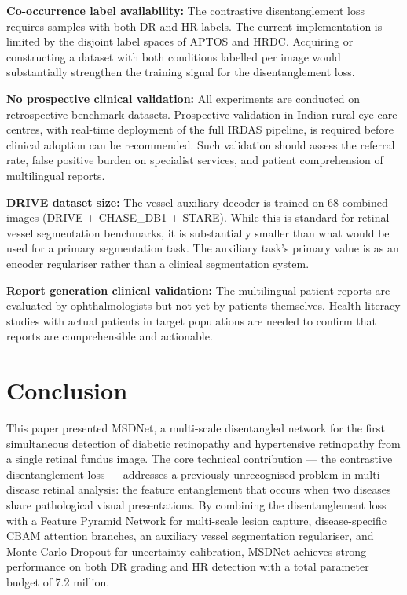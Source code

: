 \documentclass[review,12pt]{elsarticle}
\begin{document}
\textbf{Co-occurrence label availability:} The contrastive disentanglement
loss requires samples with both DR and HR labels. The current implementation
is limited by the disjoint label spaces of APTOS and HRDC. Acquiring or
constructing a dataset with both conditions labelled per image would
substantially strengthen the training signal for the disentanglement loss.

\textbf{No prospective clinical validation:} All experiments are conducted
on retrospective benchmark datasets. Prospective validation in Indian rural
eye care centres, with real-time deployment of the full IRDAS pipeline, is
required before clinical adoption can be recommended. Such validation should
assess the referral rate, false positive burden on specialist services, and
patient comprehension of multilingual reports.

\textbf{DRIVE dataset size:} The vessel auxiliary decoder is trained on
68 combined images (DRIVE + CHASE\_DB1 + STARE). While this is standard
for retinal vessel segmentation benchmarks, it is substantially smaller than
what would be used for a primary segmentation task. The auxiliary task's
primary value is as an encoder regulariser rather than a clinical segmentation
system.

\textbf{Report generation clinical validation:} The multilingual patient
reports are evaluated by ophthalmologists but not yet by patients themselves.
Health literacy studies with actual patients in target populations are needed
to confirm that reports are comprehensible and actionable.

\section{Conclusion}
\label{sec:conclusion}

This paper presented MSDNet, a multi-scale disentangled network for the first
simultaneous detection of diabetic retinopathy and hypertensive retinopathy
from a single retinal fundus image. The core technical contribution — the
contrastive disentanglement loss — addresses a previously unrecognised problem
in multi-disease retinal analysis: the feature entanglement that occurs when
two diseases share pathological visual presentations. By combining the
disentanglement loss with a Feature Pyramid Network for multi-scale lesion
capture, disease-specific CBAM attention branches, an auxiliary vessel
segmentation regulariser, and Monte Carlo Dropout for uncertainty calibration,
MSDNet achieves strong performance on both DR grading and HR detection with
a total parameter budget of 7.2 million.
\end{document}

